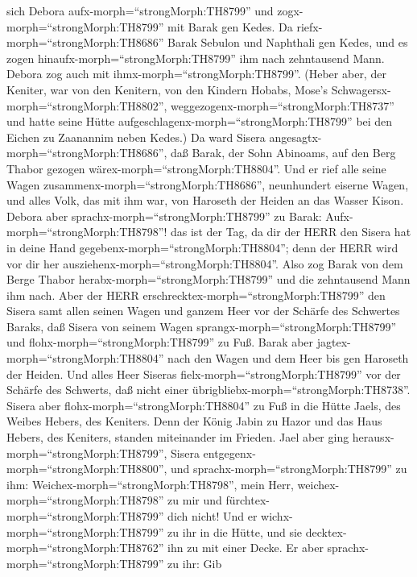 sich Debora aufx-morph=``strongMorph:TH8799'' und
zogx-morph=``strongMorph:TH8799'' mit Barak gen Kedes.  Da
riefx-morph=``strongMorph:TH8686'' Barak Sebulon und Naphthali gen
Kedes, und es zogen hinaufx-morph=``strongMorph:TH8799'' ihm nach
zehntausend Mann. Debora zog auch mit ihmx-morph=``strongMorph:TH8799''.
 (Heber aber, der Keniter, war von den Kenitern, von den
Kindern Hobabs, Mose's Schwagersx-morph=``strongMorph:TH8802'',
weggezogenx-morph=``strongMorph:TH8737'' und hatte seine Hütte
aufgeschlagenx-morph=``strongMorph:TH8799'' bei den Eichen zu Zaanannim
neben Kedes.)  Da ward Sisera
angesagtx-morph=``strongMorph:TH8686'', daß Barak, der Sohn Abinoams,
auf den Berg Thabor gezogen wärex-morph=``strongMorph:TH8804''.
 Und er rief alle seine Wagen
zusammenx-morph=``strongMorph:TH8686'', neunhundert eiserne Wagen, und
alles Volk, das mit ihm war, von Haroseth der Heiden an das Wasser
Kison.  Debora aber sprachx-morph=``strongMorph:TH8799'' zu
Barak: Aufx-morph=``strongMorph:TH8798''! das ist der Tag, da dir der
HERR den Sisera hat in deine Hand gegebenx-morph=``strongMorph:TH8804'';
denn der HERR wird vor dir her ausziehenx-morph=``strongMorph:TH8804''.
Also zog Barak von dem Berge Thabor herabx-morph=``strongMorph:TH8799''
und die zehntausend Mann ihm nach.  Aber der HERR
erschrecktex-morph=``strongMorph:TH8799'' den Sisera samt allen seinen
Wagen und ganzem Heer vor der Schärfe des Schwertes Baraks, daß Sisera
von seinem Wagen sprangx-morph=``strongMorph:TH8799'' und
flohx-morph=``strongMorph:TH8799'' zu Fuß.  Barak aber
jagtex-morph=``strongMorph:TH8804'' nach den Wagen und dem Heer bis gen
Haroseth der Heiden. Und alles Heer Siseras
fielx-morph=``strongMorph:TH8799'' vor der Schärfe des Schwerts, daß
nicht einer übrigbliebx-morph=``strongMorph:TH8738''. 
Sisera aber flohx-morph=``strongMorph:TH8804'' zu Fuß in die Hütte
Jaels, des Weibes Hebers, des Keniters. Denn der König Jabin zu Hazor
und das Haus Hebers, des Keniters, standen miteinander im Frieden.
 Jael aber ging herausx-morph=``strongMorph:TH8799'',
Sisera entgegenx-morph=``strongMorph:TH8800'', und
sprachx-morph=``strongMorph:TH8799'' zu ihm:
Weichex-morph=``strongMorph:TH8798'', mein Herr,
weichex-morph=``strongMorph:TH8798'' zu mir und
fürchtex-morph=``strongMorph:TH8799'' dich nicht! Und er
wichx-morph=``strongMorph:TH8799'' zu ihr in die Hütte, und sie
decktex-morph=``strongMorph:TH8762'' ihn zu mit einer Decke.
 Er aber sprachx-morph=``strongMorph:TH8799'' zu ihr: Gib
